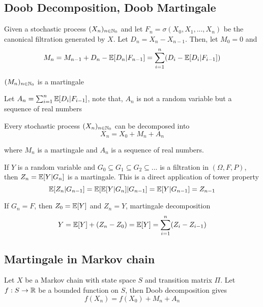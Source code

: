 \documentclass{report}
\begin{document}
 \subsection{Doob Decomposition, Doob Martingale}

Given a stochastic process $(X_n)_{n \in \mathbb{N}_0}$ and let $F_n = \sigma(X_0, X_1, ..., X_n)$ be the canonical filtration generated by $X$. Let $D_n = X_n - X_{n-1}$. Then, let $M_0 = 0$ and
$$
	M_n = M_{n-1} + D_n - \mathbb{E}[D_n | F_{n-1}] = \sum_{i=1}^n (D_i - \mathbb{E}[D_i |F_{i-1}])
$$ 

\begin{proposition}
	$(M_n)_{n \in \mathbb{N}_0}$ is a martingale	
\end{proposition}

Let $A_n = \sum_{i=1}^n \mathbb{E}[D_i |F_{i-1}]$, note that, $A_n$ is not a random variable but a sequence of real numbers

\begin{theorem}
	Every stochastic process $(X_n)_{n \in \mathbb{N}_0}$ can be decomposed into
	$$
		X_n = X_0 + M_n + A_n
	$$
	
	where $M_n$ is a martingale and $A_n$ is a sequence of real numbers.
\end{theorem}

\begin{proposition}
	If $Y$ is a random variable and $G_0 \subseteq G_1 \subseteq G_2 \subseteq ...$ is a filtration in $(\Omega, F, P)$, then
	$
		Z_n = \mathbb{E}[Y | G_n]
	$
	is a martingale. This is a direct application of tower property
	$$
		\mathbb{E}[Z_n | G_{n-1}] = \mathbb{E}[\mathbb{E}[Y | G_n] | G_{n-1}] =  \mathbb{E}[Y | G_{n-1}] = Z_{n-1}
	$$
	
	If $G_n = F$, then $Z_0 = \mathbb{E}[Y]$ and $Z_n = Y$, martingale decomposition
	$$
		Y = \mathbb{E}[Y] + (Z_n - Z_0) = \mathbb{E}[Y] = \sum_{i=1}^n (Z_i - Z_{i-1})
	$$
\end{proposition}





\subsection{Martingale in Markov chain}

Let $X$ be a Markov chain with state space $S$ and transition matrix $\Pi$. Let $f: S \to \mathbb{R}$ be a bounded function on $S$, then Doob decomposition gives
$$
	f(X_n) = f(X_0) + M_n + A_n
$$
\end{document}
